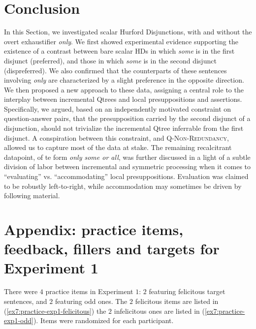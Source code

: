 \section{Conclusion}
In this Section, we investigated scalar Hurford Disjunctions, with and without the overt exhaustifier \textit{only}. We first showed experimental evidence supporting the existence of a contrast between bare scalar HDs in which \textit{some} is in the first disjunct (preferred), and those in which \textit{some} is in the second disjunct (dispreferred). We also confirmed that the counterparts of these sentences involving \textit{only} are characterized by a slight preference in the opposite direction. We then proposed a new approach to these data, assigning a central role to the interplay between incremental Qtrees and local presuppositions and assertions. Specifically, we argued, based on an independently motivated constraint on question-answer pairs, that the presupposition carried by the second disjunct of a disjunction, should not trivialize the incremental Qtree inferrable from the first disjunct. A conspiration between this constraint, and \textsc{Q-Non-Redundancy}, allowed us to capture most of the data at stake. The remaining recalcitrant datapoint, of te form \textit{only some or all}, was further discussed in a light of a subtle division of labor between incremental and symmetric processing when it comes to ``evaluating'' vs. ``accommodating'' local presuppositions. Evaluation was claimed to be robustly left-to-right, while accommodation may sometimes be driven by following material.


\section{Appendix: practice items, feedback, fillers and targets for Experiment 1}\label{sec7:exp1-practice-feedback}

There were $4$ practice items in Experiment $1$: $2$ featuring felicitous target sentences, and $2$ featuring odd ones. The $2$ felicitous items are listed in (\ref{ex7:practice-exp1-felicitous}) the $2$ infelicitous ones are listed in (\ref{ex7:practice-exp1-odd}). Items were randomized for each participant.

